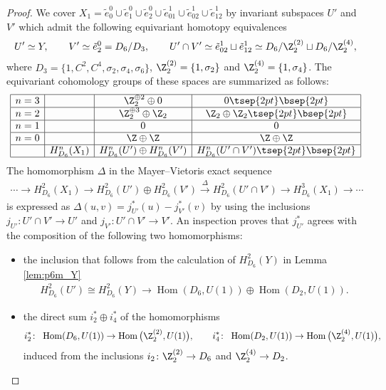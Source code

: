 \begin{proof}
We cover $X_1 = \tilde{e}^0_0 \cup \tilde{e}^0_1 \cup \tilde{e}^0_2 \cup \tilde{e}^1_{01} \cup \tilde{e}^1_{02} \cup \tilde{e}^1_{12}$ by invariant subspaces $U'$ and $V'$ which admit the following equivariant homotopy equivalences
\begin{gather*}
U' \simeq Y, \qquad
V' \simeq \tilde{e}^0_2 = D_6/D_3, \qquad
U' \cap V' \simeq \tilde{e}^1_{02} \sqcup \tilde{e}^1_{12} \simeq D_6/\Z_2^{(2)} \sqcup D_6/\Z_2^{(4)},
\end{gather*}
where $D_3 = \{ 1, C^2, C^4, \sigma_2, \sigma_4, \sigma_6 \}$, $\Z_2^{(2)} = \{ 1, \sigma_2 \}$ and $\Z_2^{(4)} = \{ 1, \sigma_4 \}$. The equivariant cohomology groups of these spaces are summarized as follows:
$$
\begin{array}{|c|c|c|c|}
\hline
n = 3 & & \Z_2^{\oplus 2} \oplus 0 & 0\tsep{2pt}\bsep{2pt} \\
\hline
n = 2 & & \Z_2^{\oplus 3} \oplus \Z_2 & \Z_2 \oplus \Z_2 \tsep{2pt}\bsep{2pt}\\
\hline
n = 1 & & 0 & 0 \\
\hline
n = 0 & & \Z \oplus \Z & \Z \oplus \Z \\
\hline
& H^n_{D_6}(X_1) & H^n_{D_6}(U') \oplus H^n_{D_6}(V') & H^n_{D_6}(U' \cap V') \tsep{2pt}\bsep{2pt}\\
\hline
\end{array}
$$
The homomorphism $\Delta$ in the Mayer--Vietoris exact sequence
\begin{gather*}
\cdots \to H^2_{D_6}(X_1) \to H^2_{D_6}(U') \oplus H^2_{D_6}(V') \overset{\Delta}{\to} H^2_{D_6}(U' \cap V') \to H^3_{D_6}(X_1) \to \cdots
\end{gather*}
is expressed as $\Delta(u, v) = j_{U'}^*(u) - j_{V'}^*(v)$ by using the inclusions $j_{U'} \colon U' \cap V' \to U'$ and $j_{V'} \colon U' \cap V' \to V'$. An inspection proves that $j_{U'}^*$ agrees with the composition of the following two homomorphisms:
\begin{itemize}\itemsep=0pt
\item[(i)]
the inclusion that follows from the calculation of $H^2_{D_6}(Y)$ in Lemma \ref{lem:p6m_Y}
\begin{gather*}
H^2_{D_6}(U') \cong H^2_{D_6}(Y) \longrightarrow
\operatorname{Hom}(D_6, U(1)) \oplus \operatorname{Hom}(D_2, U(1)).
\end{gather*}

\item[(ii)]
the direct sum $i_2^* \oplus i_4^*$ of the homomorphisms
\begin{gather*}
i^*_2 \colon \ \operatorname{Hom}(D_6, U(1)) \to \operatorname{Hom}\big(\Z_2^{(2)}, U(1)\big), \qquad
i^*_4 \colon \ \operatorname{Hom}(D_2, U(1)) \to \operatorname{Hom}\big(\Z_2^{(4)}, U(1)\big),
\end{gather*}
induced from the inclusions $i_2\colon \Z_2^{(2)} \to D_6$ and $\Z_2^{(4)} \to D_2$.


\end{itemize}
\end{proof}
